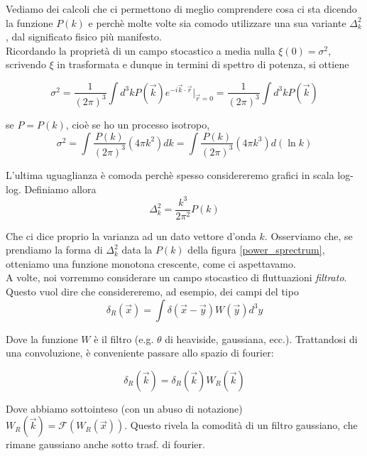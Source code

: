\documentclass{report}
\begin{document}
Vediamo dei calcoli che ci permettono di meglio comprendere cosa ci sta dicendo la funzione $P(k)$ e perchè molte volte sia comodo utilizzare una sua variante $\Delta_k^2$, dal significato fisico più manifesto. \\

Ricordando la proprietà di un campo stocastico a media nulla $\xi(0) = \sigma^2$, scrivendo $\xi$ in trasformata e dunque in termini di spettro di potenza, si ottiene

\begin{equation}
    \sigma^2 = \frac{1}{(2\pi)^3}\int d^3k P(\vec{k})e^{-i\vec{k}\cdot \vec{r}}\biggr|_{\vec{r}=0} = \frac{1}{(2\pi)^3}\int d^3kP(\vec{k})
\end{equation}

se $P=P(k)$, cioè se ho un processo isotropo, 
\begin{equation}
    \sigma^2 = \int \frac{P(k)}{(2\pi)^3}(4\pi k^2 )dk = \int \frac{P(k)}{(2\pi)^3}(4\pi k^3 )d(\ln{k}) 
\end{equation}

L'ultima uguaglianza è comoda perchè spesso considereremo grafici in scala log-log. Definiamo allora 
\begin{equation}
    \Delta_k^2 = \frac{k^3}{2\pi^2}P(k)
\end{equation}

Che ci dice proprio la varianza ad un dato vettore d'onda $k$. Osserviamo che, se prendiamo la forma di $\Delta_k^2$ data la $P(k)$ della figura \ref{power_sprectrum}, otteniamo una funzione monotona crescente, come ci aspettavamo. \\

A volte, noi vorremmo considerare un campo stocastico di fluttuazioni \emph{filtrato}. Questo vuol dire che considereremo, ad esempio, dei campi del tipo 
\begin{equation}
    \delta_R(\vec{x}) = \int \delta(\vec{x}- \vec{y})W(\vec{y}) d^3y
\end{equation}

Dove la funzione $W$ è il filtro (e.g. $\theta$ di heaviside, gaussiana, ecc.). Trattandosi di una convoluzione, è conveniente passare allo spazio di fourier: 

\begin{equation}
    \delta_R(\vec{k}) = \delta_R(\vec{k})W_R(\vec{k})
\end{equation}

Dove abbiamo sottointeso (con un abuso di notazione) $W_R(\vec{k}) = \mathcal{F}(W_R(\vec{x}))$. Questo rivela la comodità di un filtro gaussiano, che rimane gaussiano anche sotto trasf. di fourier. 
\end{document}
